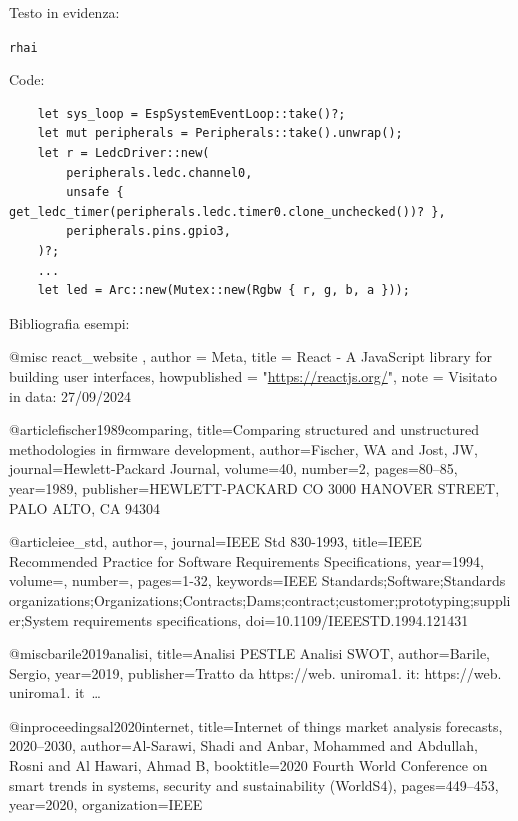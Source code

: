 Testo in evidenza:

\texttt{rhai}

Code:

\begin{listing}[H]
    \begin{verbatim}
    let sys_loop = EspSystemEventLoop::take()?;
    let mut peripherals = Peripherals::take().unwrap();
    let r = LedcDriver::new(
        peripherals.ledc.channel0,
        unsafe { get_ledc_timer(peripherals.ledc.timer0.clone_unchecked())? },
        peripherals.pins.gpio3,
    )?;
    ...
    let led = Arc::new(Mutex::new(Rgbw { r, g, b, a }));
\end{verbatim}
\end{listing}

Bibliografia esempi:

@misc{ react_website ,
    author = {Meta},
    title = {React - A JavaScript library for building user interfaces},
    howpublished = "\url{https://reactjs.org/}",
    note = {Visitato in data: 27/09/2024}
}

@article{fischer1989comparing,
  title={Comparing structured and unstructured methodologies in firmware development},
  author={Fischer, WA and Jost, JW},
  journal={Hewlett-Packard Journal},
  volume={40},
  number={2},
  pages={80--85},
  year={1989},
  publisher={HEWLETT-PACKARD CO 3000 HANOVER STREET, PALO ALTO, CA 94304}
}

@article{iee_std,
  author={},
  journal={IEEE Std 830-1993}, 
  title={IEEE Recommended Practice for Software Requirements Specifications}, 
  year={1994},
  volume={},
  number={},
  pages={1-32},
  keywords={IEEE Standards;Software;Standards organizations;Organizations;Contracts;Dams;contract;customer;prototyping;supplier;System requirements specifications},
  doi={10.1109/IEEESTD.1994.121431}
}

@misc{barile2019analisi,
  title={Analisi PESTLE Analisi SWOT},
  author={Barile, Sergio},
  year={2019},
  publisher={Tratto da https://web. uniroma1. it: https://web. uniroma1. it~…}
}

@inproceedings{al2020internet,
  title={Internet of things market analysis forecasts, 2020--2030},
  author={Al-Sarawi, Shadi and Anbar, Mohammed and Abdullah, Rosni and Al Hawari, Ahmad B},
  booktitle={2020 Fourth World Conference on smart trends in systems, security and sustainability (WorldS4)},
  pages={449--453},
  year={2020},
  organization={IEEE}
}

